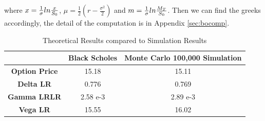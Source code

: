 \documentclass[11pt,a4paper,fleqn,draft]{article}
\begin{document}
where $x = {1\over \sigma}ln {x\over S_0}$, $\mu=\frac{1}{2}(r-\frac{\sigma^2}{2})$ and $m = {1\over \sigma}ln {M_T\over S_0}$. Then we can find the greeks accordingly, the detail of the computation is in Appendix \ref{sec:bocomp}.\\


\begin{table} 
\centering
\begin{subtable}{\textwidth}
  \centering
\begin{tabular}{|c|c|c|}
\hline
     & \textbf{Black Scholes} & \textbf{Monte Carlo 100,000 Simulation}\\ \hline
\textbf{Option Price} & 15.18 & 15.11 \\ \hline
\textbf{Delta LR} & 0.776 & 0.769\\ \hline
\textbf{Gamma LRLR} & 2.58 e-3 & 2.89 e-3\\ \hline
\textbf{Vega LR} &15.55 &16.02\\ \hline
\end{tabular}
\caption{Theoretical Results compared to Simulation Results}
\end{subtable}
\end{table}
\end{document}
